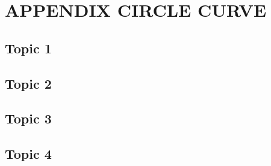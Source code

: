 \section{\textbf{APPENDIX CIRCLE CURVE}} \label{APPENDIX CIRCLE CURVE}


\subsection{Topic 1}


\subsection{Topic 2}



\subsection{Topic 3}


\subsection{Topic 4}






\clearpage
\pagebreak
